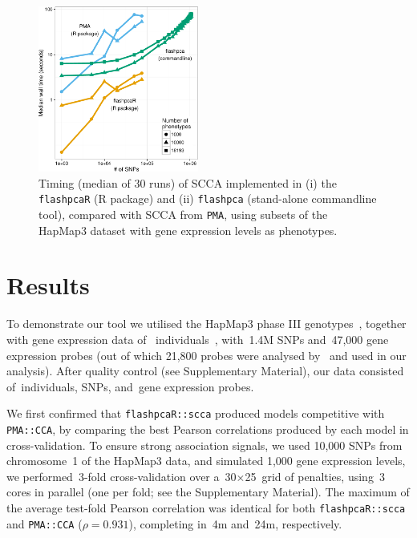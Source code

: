 \documentclass{bioinfo}
\begin{document}
\begin{figure}[!tpb]
\centerline{\includegraphics[width=0.47\textwidth]{scca_timing-crop.pdf}}
\caption{
Timing (median of 30 runs) of SCCA implemented in (i) the \texttt{flashpcaR}
(\textsf{R} package) and (ii) \texttt{flashpca} (stand-alone commandline tool),
compared with SCCA from \texttt{PMA}, using subsets of the HapMap3 dataset with gene
expression levels as phenotypes.
}
\label{fig:01}
\end{figure}

\section{Results}

To demonstrate our tool we utilised the HapMap3 phase III
genotypes~\citep{hapmap2010}, together with gene expression data of~\nindiv
individuals~\citep{Stranger2012}, with~1.4M SNPs and~47,000 gene expression
probes (out of which 21,800 probes were analysed by~\citet{Stranger2012} and
used in our analysis). After quality control (see Supplementary Material),
our data consisted of~\nindiv individuals, \nsnps SNPs, and~\ngenes gene
expression probes.

We first confirmed that \texttt{flashpcaR::scca} produced models competitive
with \texttt{PMA::CCA}, by comparing the best Pearson correlations produced
by each model in cross-validation.  To ensure strong association signals,
we used 10,000 SNPs from chromosome~1 of the HapMap3 data, and simulated
1,000 gene expression levels, we performed~3-fold cross-validation over
a~30$\times$25~grid of penalties, using~3 cores in parallel (one per fold;
see the Supplementary Material). The maximum of the average test-fold
Pearson correlation was identical for both \texttt{flashpcaR::scca} and
\texttt{PMA::CCA} ($\rho{=}0.931$), completing in~4m and~24m, respectively.
\end{document}
